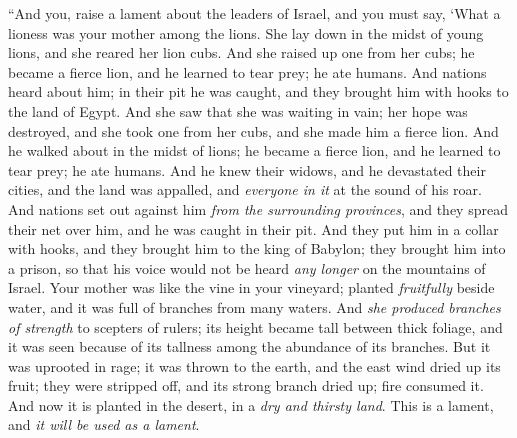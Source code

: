 \begin{biblechapter} %
 “And you, raise a lament about the leaders of Israel,
\verse and you must say,
\verse ‘What a lioness was your mother 
among the lions. 
She lay down in the midst of young lions, 
and she reared her lion cubs.
\verse And she raised up one from her cubs; 
he became a fierce lion, 
and he learned to tear prey; 
he ate humans.
\verse And nations heard about him; 
in their pit he was caught, 
and they brought him with hooks 
to the land of Egypt.
\verse And she saw that she was waiting in vain; 
her hope was destroyed, 
and she took one from her cubs, 
and she made him a fierce lion.
\verse And he walked about in the midst of lions; 
he became a fierce lion, 
and he learned to tear prey; 
he ate humans.
\verse And he knew their widows, 
and he devastated their cities, 
and the land was appalled, and \textit{everyone in it} 
at the sound of his roar.
\verse And nations set out against him 
\textit{from the surrounding provinces}, 
and they spread their net over him, 
and he was caught in their pit.
\verse And they put him in a collar with hooks, 
and they brought him to the king of Babylon; 
they brought him into a prison, 
so that his voice would not be heard \textit{any longer} 
on the mountains of Israel.
\verse Your mother was like the vine in your vineyard; 
planted \textit{fruitfully} beside water, 
and it was full of branches 
from many waters.
\verse And \textit{she produced branches of strength} 
to scepters of rulers; 
its height became tall 
between thick foliage, 
and it was seen because of its tallness 
among the abundance of its branches.
\verse But it was uprooted in rage; 
it was thrown to the earth, 
and the east wind dried up its fruit; 
they were stripped off, 
and its strong branch dried up; 
fire consumed it.
\verse And now it is planted in the desert, 
in a \textit{dry and thirsty land}. This is a lament, and \textit{it will be used as a lament}.
\end{biblechapter}

